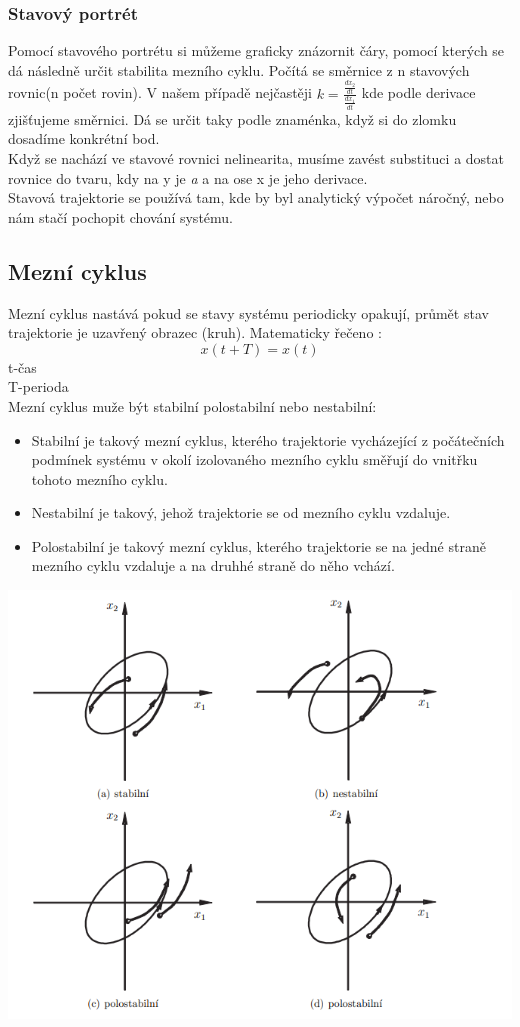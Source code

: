 \subsubsection*{Stavový portrét}
Pomocí stavového portrétu si můžeme graficky znázornit čáry, pomocí kterých se dá následně určit stabilita mezního cyklu. Počítá se směrnice z n stavových rovnic(n počet rovin). V našem případě nejčastěji $k = \frac{\frac{dx_2}{dt}}{\frac{dx_1}{dt}}$ kde podle derivace zjišťujeme směrnici. Dá se určit taky podle znaménka, když si do zlomku dosadíme konkrétní bod.\\
Když se nachází ve stavové rovnici nelinearita, musíme zavést substituci a dostat rovnice do tvaru, kdy na y je \textit{a} a na ose x je jeho derivace.\\
Stavová trajektorie se používá tam, kde by byl analytický výpočet náročný, nebo nám stačí pochopit chování systému.

\subsection{Mezní cyklus}
Mezní cyklus nastává pokud se stavy systému periodicky opakují, průmět stav trajektorie je uzavřený obrazec (kruh).
Matematicky řečeno : 
\[x(t+T)=x(t)\]
t-čas \\ T-perioda\\

Mezní cyklus muže být stabilní polostabilní nebo nestabilní:
\begin{itemize}
    \item Stabilní je takový mezní cyklus, kterého trajektorie vycházející z počátečních podmínek systému v okolí izolovaného mezního cyklu směřují do vnitřku tohoto mezního cyklu.
    \item Nestabilní je takový, jehož trajektorie se od mezního cyklu vzdaluje.
    \item Polostabilní je takový mezní cyklus, kterého trajektorie se na jedné straně mezního cyklu vzdaluje a na druhhé straně do něho vchází.
\end{itemize}
\includegraphics{img/mez_cykly.png}

